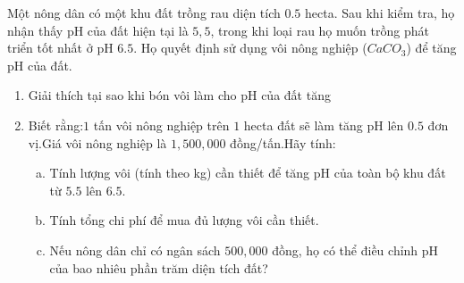 \documentclass[Main.tex]{subfiles}
\begin{document}
\begin{bt}
	Một nông dân có một khu đất trồng rau diện tích $0.5$ hecta. Sau khi kiểm tra, họ nhận thấy pH của đất hiện tại là $5{,}5$, trong khi loại rau họ muốn trồng phát triển tốt nhất ở pH $6.5$. Họ quyết định sử dụng vôi nông nghiệp ($CaCO_3$) để tăng pH của đất.
	\begin{enumerate}
		\item Giải thích tại sao khi bón vôi làm cho pH của đất tăng
		\item Biết rằng:$1$ tấn vôi nông nghiệp trên $1$ hecta đất sẽ làm tăng pH lên $0.5$ đơn vị.Giá vôi nông nghiệp là $1{,}500{,}000$ đồng/tấn.Hãy tính:
		\begin{enumerate}[a)]
			\item Tính lượng vôi (tính theo kg) cần thiết để tăng pH của toàn bộ khu đất từ $5.5$ lên $6.5$.
			\item Tính tổng chi phí để mua đủ lượng vôi cần thiết.
			\item Nếu nông dân chỉ có ngân sách $500{,}000$ đồng, họ có thể điều chỉnh pH của bao nhiêu phần trăm diện tích đất?
		\end{enumerate}
	\end{enumerate}
\end{bt}
\end{document}
